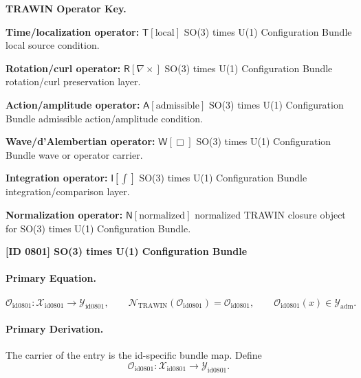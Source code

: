 \par\vspace{0.45\baselineskip}
\noindent\begin{minipage}[t]{\linewidth}
\begingroup
\small
\raggedright
\textbf{TRAWIN Operator Key.}\par
\noindent\textbf{Time/localization operator:} $\mathsf{T}\!\left[\mathrm{local}\right]$ SO(3) times U(1) Configuration Bundle local source condition.\par
\noindent\textbf{Rotation/curl operator:} $\mathsf{R}\!\left[\nabla\times\right]$ SO(3) times U(1) Configuration Bundle rotation/curl preservation layer.\par
\noindent\textbf{Action/amplitude operator:} $\mathsf{A}\!\left[\mathrm{admissible}\right]$ SO(3) times U(1) Configuration Bundle admissible action/amplitude condition.\par
\noindent\textbf{Wave/d'Alembertian operator:} $\mathsf{W}\!\left[\Box\right]$ SO(3) times U(1) Configuration Bundle wave or operator carrier.\par
\noindent\textbf{Integration operator:} $\mathsf{I}\!\left[\int\right]$ SO(3) times U(1) Configuration Bundle integration/comparison layer.\par
\noindent\textbf{Normalization operator:} $\mathsf{N}\!\left[\mathrm{normalized}\right]$ normalized TRAWIN closure object for SO(3) times U(1) Configuration Bundle.\par
\endgroup
\end{minipage}

\clearpage
\noindent\textbf{[ID 0801] SO(3) times U(1) Configuration Bundle}\par
\vspace{0.35em}
\paragraph{Primary Equation.}
\[
\mathcal{O}_{\mathrm{id0801}}:\mathcal{X}_{\mathrm{id0801}}\longrightarrow \mathcal{Y}_{\mathrm{id0801}},\qquad
\mathcal{N}_{\mathrm{TRAWIN}}(\mathcal{O}_{\mathrm{id0801}})=\mathcal{O}_{\mathrm{id0801}},\qquad
\mathcal{O}_{\mathrm{id0801}}(x)\in\mathcal{Y}_{\mathrm{adm}}.
\]

\paragraph{Primary Derivation.} The carrier of the entry is the id-specific bundle map.  Define\[
\mathcal{O}_{\mathrm{id0801}}:\mathcal{X}_{\mathrm{id0801}}\longrightarrow \mathcal{Y}_{\mathrm{id0801}}.
\]

